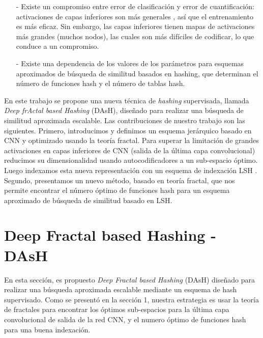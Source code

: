 \begin{itemize}

\item[-]  Existe un compromiso  entre error de clasificación y error de cuantificación: activaciones de capas inferiores son más generales \cite{DBLP:journals/corr/YosinskiCBL14}, así que el entrenamiento es más eficaz. Sin embargo, las capas inferiores tienen mapas de activaciones más grandes (muchos nodos), las cuales son más difíciles de codificar, lo que conduce a un compromiso. 
	
\item[-] Existe una dependencia de los valores de los parámetros para esquemas aproximados de búsqueda de similitud basados en hashing, que determinan el número de funciones hash y el número de tablas hash.  
 
\end{itemize}

En este trabajo  se propone una nueva técnica de \textit{hashing} supervisada,  llamada  \textit{Deep frActal based  Hashing} (DAsH),  diseñado para realizar una búsqueda de similitud aproximada escalable. Las contribuciones de nuestro trabajo son las siguientes. Primero,  introducimos y definimos un esquema jerárquico basado en CNN y optimizado usando la teoría fractal. Para superar la limitación de grandes activaciones en capas inferiores de CNN (salida de la última capa convolucional) reducimos su dimensionalidad usando autocodificadores a un sub-espacio óptimo. Luego indexamos esta nueva representación con un esquema de indexación LSH \cite{lshtutorial}.  Segundo, presentamos un nuevo método, basado en teoría fractal, que nos permite encontrar el número óptimo de funciones hash para un esquema aproximado de búsqueda de similitud basado en LSH.
  
 
\section{Deep Fractal based  Hashing - DAsH}

En esta sección, es propuesto \textit{Deep Fractal based  Hashing} (DAsH) diseñado para realizar una búsqueda aproximada escalable mediante un esquema de hash supervisado. Como se presentó en la sección 1, nuestra estrategia es usar la teoría de fractales para encontrar los óptimos sub-espacios para la última capa convolucional de salida de la red CNN, y el numero óptimo de funciones hash para una buena indexación. 

